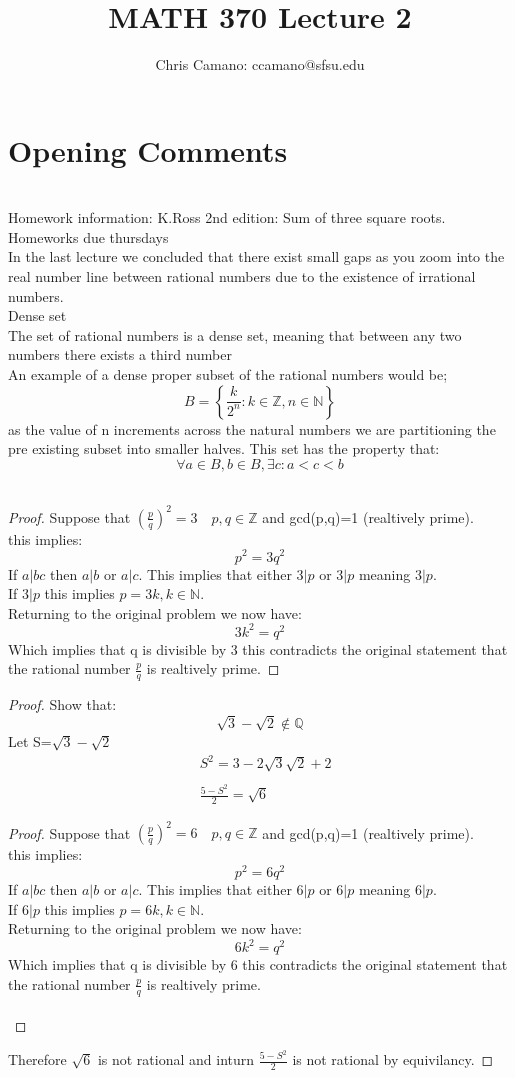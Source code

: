 \documentclass[12pt]{article}
\author{Chris Camano: ccamano@sfsu.edu}
\title{MATH 370  Lecture 2 }
\date
\newcommand{\sect}[1]{\section*{#1}}
\newcommand{\Q}{\mathbb{Q}}
\newcommand{\Z}{\mathbb{Z}}
\newcommand{\N}{\mathbb{N}}
\theoremstyle{definition}
\theoremstyle{remark}
\numberwithin{equation}{section}
\begin{document}
\maketitle
\sect{Opening Comments}\\
Homework information: K.Ross 2nd edition: Sum of three square roots. Homeworks due thursdays  \\
In the last lecture we concluded that there exist small gaps as you zoom into the real number line between rational numbers due to the existence of irrational numbers. \\
 Dense set\\
The set of rational numbers is a dense set, meaning that between any two numbers there exists a third number
\\
An example of a dense proper subset of the rational numbers would be;
\[
   B=\left\{\frac{k}{2^n}: k \in \Z, n \in \N\right\}
\]
as the value of n increments across the natural numbers we are partitioning the pre existing subset into smaller halves. This set has the property that:
\[
  \forall a\in B, b\in B, \exists c: a<c<b
\]\\
\begin{proof}
  Suppose that $\left(\frac{p}{q}\right)^2=3\quad p,q\in \Z$ and gcd(p,q)=1 (realtively prime).\\
  this implies:
  \[
    p^2=3q^2
  \]
  If $a|bc$ then $a|b$ or $a|c$. This implies that either $3|p$ or $3|p$ meaning $3|p$.\\
  If $3|p$ this implies $p=3k,k\in \N$.\\
  Returning to the original problem we now have:
  \[
    3k^2=q^2
  \]
  Which implies that q is divisible by 3 this contradicts the original statement that the rational number $\frac{p}{q}$ is realtively prime.
\end{proof}
\begin{proof}Show that:
  \[
    \sqrt{3}-\sqrt{2}\notin \Q
  \]
  Let S=$\sqrt{3}-\sqrt{2}$
\begin{align*}
  &S^2=3-2\sqrt{3}\sqrt{2}+2\\\\
  &\frac{5-S^2}{2}=\sqrt{6}
\end{align*}
\begin{proof}
  Suppose that $\left(\frac{p}{q}\right)^2=6\quad p,q\in \Z$ and gcd(p,q)=1 (realtively prime).\\
  this implies:
  \[
    p^2=6q^2
  \]
  If $a|bc$ then $a|b$ or $a|c$. This implies that either $6|p$ or $6|p$ meaning $6|p$.\\
  If $6|p$ this implies $p=6k,k\in \N$.\\
  Returning to the original problem we now have:
  \[
    6k^2=q^2
  \]
  Which implies that q is divisible by 6 this contradicts the original statement that the rational number $\frac{p}{q}$ is realtively prime.\\\\

\end{proof}
Therefore $\sqrt{6}$ is not rational and inturn $\frac{5-S^2}{2}$ is not rational by equivilancy.
\end{proof}
\end{document}
